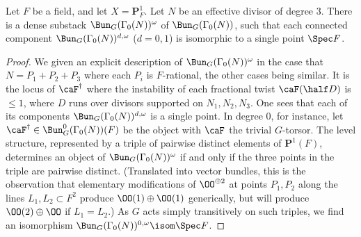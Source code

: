 \documentclass{article}
\def\P{\mathbf{P}}
\begin{document}
\begin{lm}\label{LemmaDescriptionOfBunGGamma0deg3} Let $F$ be a field, and let $X=\mathbf{P}^1_F$.  Let $N$ be an effective divisor of degree 3.  There is a dense substack $\Bun_G(\Gamma_0(N))^{\omega}$ of $\Bun_G(\Gamma_0(N))$, such that each connected component $\Bun_G(\Gamma_0(N))^{d,\omega}$ ($d=0,1$) is isomorphic to a single point $\Spec F$.
\end{lm}

\begin{proof}  We given an explicit description of $\Bun_G(\Gamma_0(N))^{\omega}$ in the case that $N=P_1+P_2+P_3$ where each $P_i$ is $F$-rational, the other cases being similar.   It is the locus of $\caF^\dagger$ where the instability of each fractional twist $\caF(\half D)$ is $\leq 1$, where $D$ runs over divisors supported on $N_1,N_2,N_3$.  One sees that each of its components $\Bun_G(\Gamma_0(N))^{d,\omega}$ is a single point.  In degree 0, for instance, let $\caF^\dagger\in \Bun_G^0(\Gamma_0(N))(F)$ be the object with $\caF$ the trivial $G$-torsor.  The level structure, represented by a triple of pairwise distinct elements of $\P^1(F)$, determines an object of $\Bun_G(\Gamma_0(N))^{\omega}$ if and only if the three points in the triple are pairwise distinct.  (Translated into vector bundles, this is the observation that elementary modifications of $\OO^{\oplus 2}$ at points $P_1,P_2$ along the lines $L_1,L_2\subset F^2$ produce $\OO(1)\oplus\OO(1)$ generically, but will produce $\OO(2)\oplus\OO$ if $L_1=L_2$.)  As $G$ acts simply transitively on such triples, we find an isomorphism $\Bun_G(\Gamma_0(N))^{0,\omega}\isom \Spec F$.

\end{proof}
\end{document}
